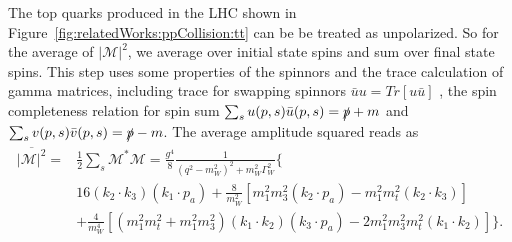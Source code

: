 \noindent The top quarks produced in the LHC shown in Figure~\ref{fig:relatedWorks:ppCollision:tt} can be be treated as unpolarized. So for the average of $|\mathcal{M}|^2$, we average over initial state spins and sum over final state spins. This step uses some properties of the spinnors and the trace calculation of gamma matrices, including trace for swapping spinnors $\bar{u} u = Tr[ u \bar{u}] $ , the spin completeness relation for spin sum $\sum_s u(p,s) \bar{u}(p,s) = \slashed{p} + m $  and $\sum_s v(p,s) \bar{v}(p,s) = \slashed{p} - m$. The average amplitude squared reads as
\begin{equation}
\begin{split}
	\overline{ |\mathcal{M}|^2 } = & \frac{1}{2} \sum_s \mathcal{M}^* \mathcal{M} =
	\frac{g^4}{8} \frac{1}{ (q^2-m^2_{W})^2 +  m^2_W \Gamma^2_W } \bigg \{  \\
	& 16  (  k_2 \cdot k_3) (  k_1 \cdot p_a) + \frac{8}{m^2_W} [ m_1^2 m_3^2 (k_2 \cdot p_a) - m_1^2 m_t^2 (k_2 \cdot k_3)] \\
	&  + \frac{4}{m^4_W} [ (m_1^2 m_t^2 + m_1^2 m_3^2) (k_1 \cdot k_2) (k_3 \cdot p_a) - 2  m_1^2 m_3^2 m_t^2  (k_1 \cdot k_2) ]\bigg\} .
\end{split}
\end{equation}

